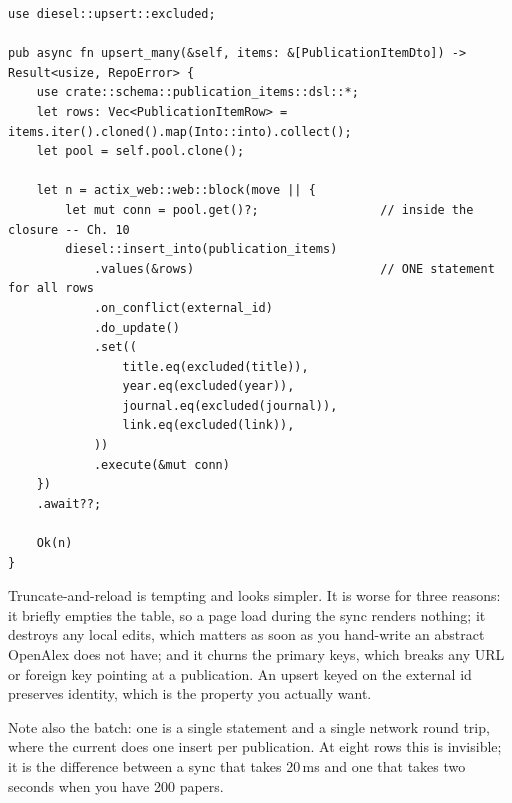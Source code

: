 \begin{lstlisting}[style=rs,caption={\file{repository.rs}: one round trip, idempotent, and no
\code{\&mut self}.}]
use diesel::upsert::excluded;

pub async fn upsert_many(&self, items: &[PublicationItemDto]) -> Result<usize, RepoError> {
    use crate::schema::publication_items::dsl::*;
    let rows: Vec<PublicationItemRow> = items.iter().cloned().map(Into::into).collect();
    let pool = self.pool.clone();

    let n = actix_web::web::block(move || {
        let mut conn = pool.get()?;                 // inside the closure -- Ch. 10
        diesel::insert_into(publication_items)
            .values(&rows)                          // ONE statement for all rows
            .on_conflict(external_id)
            .do_update()
            .set((
                title.eq(excluded(title)),
                year.eq(excluded(year)),
                journal.eq(excluded(journal)),
                link.eq(excluded(link)),
            ))
            .execute(&mut conn)
    })
    .await??;

    Ok(n)
}
\end{lstlisting}

\begin{why}
Truncate-and-reload is tempting and looks simpler. It is worse for three reasons: it briefly empties
the table, so a page load during the sync renders nothing; it destroys any local edits, which
matters as soon as you hand-write an abstract OpenAlex does not have; and it churns the primary
keys, which breaks any URL or foreign key pointing at a publication. An upsert keyed on the external
id preserves identity, which is the property you actually want.

Note also the batch: one  is a single statement and a single
network round trip, where the current  does one insert per publication. At eight rows
this is invisible; it is the difference between a sync that takes 20\,ms and one that takes two
seconds when you have 200 papers.
\end{why}
